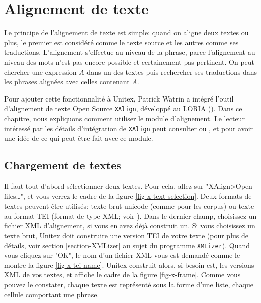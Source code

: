 \chapter{Alignement de texte}
\label{chap-alignment}
Le principe de l'alignement de texte est simple: quand on aligne deux textes ou plus, le premier est
considéré comme le texte source et les autres comme ses traductions. L'alignement s'effectue au
niveau de la phrase, parce l'alignement au niveau des mots n'est pas encore possible et certainement
pas pertinent. On peut chercher une expression $A$ dans un des textes puis rechercher ses
traductions dans les phrases alignées avec celles contenant $A$.

\bigskip
\noindent Pour ajouter cette fonctionnalité à Unitex, Patrick Watrin a intégré l'outil d'alignement
de texte Open Source \verb+XAlign+, développé au LORIA (\cite{XAlign}). Dans ce chapitre, nous
expliquons comment utiliser le module d'alignement. Le lecteur intéressé par les détails
d'intégration de \verb+XAlign+ peut consulter  \cite{IGML_DumPau08} ou \cite{IGML_PauDum08}, et
\cite{dusko_xalign} pour avoir une idée de ce qui peut être fait avec ce module.

\section{Chargement de textes}
Il faut tout d'abord sélectionner deux textes. Pour cela, allez sur "XAlign>Open files\ldots",
et vous verrez le cadre de la figure \ref{fig-x-text-selection}. Deux formats de textes peuvent être
utilisés: texte brut unicode (comme pour les corpus) ou texte au format TEI
(format de type XML; voir \cite{TEI}). Dans le dernier champ, choisissez un fichier XML
d'alignement, si vous en avez déjà construit un. Si vous choisissez un texte brut, Unitex doit
construire une version TEI de votre texte (pour plus de détails, voir section \ref{section-XMLizer}
au sujet du programme \verb+XMLizer+). Quand vous cliquez sur "OK", le nom d'un fichier  XML vous
est demandé comme le montre la figure \ref{fig-x-tei-name}. Unitex construit alors, si besoin est,
les versions XML de vos textes, et affiche le cadre de la figure \ref{fig-x-frame}. Comme vous
pouvez le constater, chaque texte est représenté sous la forme d'une liste, chaque cellule
comportant une phrase.

